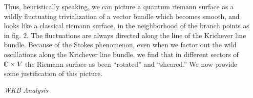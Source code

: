 %
%
%
Thus, heuristically speaking, we can 
picture a quantum riemann surface as 
a wildly fluctuating trivialization of a vector bundle 
which becomes smooth, and looks like a classical riemann surface,
in the neighborhood of the branch points as in fig. 2. 
The fluctuations are always directed along the line of the 
Krichever line bundle. 
Because of the Stokes phenomenon, even when we factor out 
the wild oscillations along the Krichever line bundle, we find 
that in different sectors of $\IC\times V$ the Riemann surface
as been ``rotated'' and ``sheared.''
We now provide some justification
of this picture.
%
%

\bigskip
{\it WKB Analysis}

